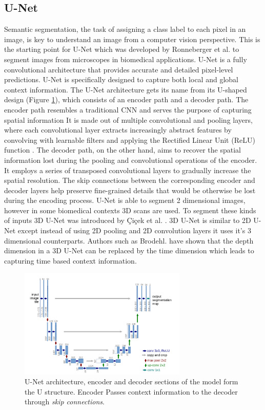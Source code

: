 \subsection{U-Net}
Semantic segmentation, the task of assigning a class label to each pixel in an image, is key to understand an image from a computer vision perspective.
This is the starting point for U-Net which was developed by Ronneberger et al. \cite{ronneberger-2015} to segment images from microscopes in biomedical applications.
U-Net is a fully convolutional architecture that provides accurate and detailed pixel-level predictions.
U-Net is specifically designed to capture both local and global context information.
The U-Net architecture gets its name from its U-shaped design (Figure \ref{fig:unet}), which consists of an encoder path and a decoder path.
The encoder path resembles a traditional CNN and serves the purpose of capturing spatial information
It is made out of multiple convolutional and pooling layers, where each convolutional layer extracts increasingly abstract features by convolving with learnable filters and applying the Rectified Linear Unit (ReLU) function \cite{relu}.
The decoder path, on the other hand, aims to recover the spatial information lost during the pooling and convolutional operations of the encoder.
It employs a series of transposed convolutional layers to gradually increase the spatial resolution.
The skip connections between the corresponding encoder and decoder layers help preserve fine-grained details that would be otherwise be lost during the encoding process.
U-Net is able to segment 2 dimensional images, however in some biomedical contexts 3D scans are used. To segment these kinds of inputs 3D U-Net was introduced by Çiçek et al. \cite{cicek-2016}.
3D U-Net is similar to 2D U-Net except instead of using 2D pooling and 2D convolution layers it uses it's 3 dimensional counterparts. Authors such as Brodehl. \cite{predictionLightning} have shown that
the depth dimension in a 3D U-Net can be replaced by the time dimension which leads to capturing time based context information.

\begin{figure}
  \includegraphics[width=8cm]{../images/unet.png}
  \caption[short]{U-Net architecture, encoder and decoder sections of the model form the U structure. Encoder Passes context information to the decoder through \textit{skip connections}. \cite{ronneberger-2015}}
  \label{fig:unet}
\end{figure}


